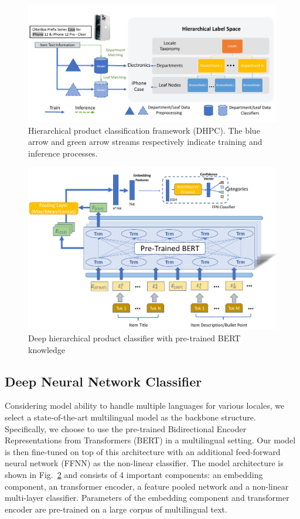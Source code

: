 \documentclass[11pt,dvipsnames]{article}
\begin{document}
\begin{figure}[h]
\center
        \includegraphics[width=0.9\linewidth]{figures/Pipeline_general.pdf}
    \caption{Hierarchical product classification framework (DHPC). The blue arrow and green arrow streams respectively indicate training and inference processes.}
    \label{fig:pipeline}
\end{figure}

\begin{figure}[h]
\center
        \includegraphics[width=0.8\linewidth]{figures/Model_structure.pdf}
    \caption{Deep hierarchical product classifier with pre-trained BERT knowledge}
    \label{fig:bertmodel}
\end{figure}





\subsection{Deep Neural Network Classifier}
Considering model ability to handle multiple languages for various locales, we select a state-of-the-art multilingual model as the backbone structure. Specifically, we choose to use the pre-trained Bidirectional Encoder Representations from Transformers (BERT) in a multilingual setting. Our model is then fine-tuned on top of this architecture with an additional feed-forward neural network (FFNN) as the non-linear classifier. The model architecture is shown in Fig.~\ref{fig:bertmodel} and consists of 4 important components: an embedding component, an transformer encoder, a feature pooled network and a non-linear multi-layer classifier. Parameters of the embedding component and transformer encoder are pre-trained on a large corpus of multilingual text.
\end{document}
